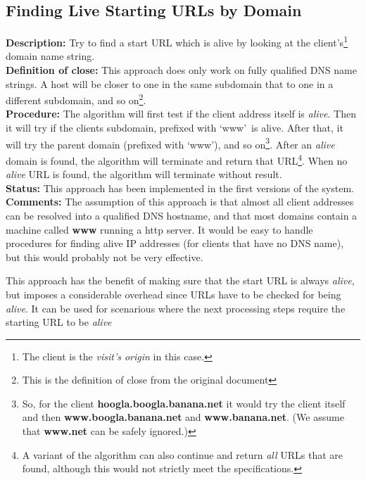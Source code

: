 \documentclass[a4paper]{danarticle}
\begin{document}
      \subsection*{Finding Live Starting URLs by Domain}
      \textbf{Description:} Try to find a start URL which is
      alive by looking at the client's\footnote{The client is the
      \textit{visit's origin} in this case.} domain name string.
      \\
      \textbf{Definition of close:} This approach does only work on
      fully qualified DNS name strings. A host will be closer to
      one in the same subdomain that to one in a different subdomain,
      and so on\footnote{This is the definition of close from the
      original document}.
      \\
      \textbf{Procedure:} The algorithm will first test if the client
      address itself is \textit{alive}. Then it will try if the
      clients subdomain, prefixed with \lq www\rq\ is alive. After
      that, it will try the parent domain (prefixed with \lq www\rq ), and
      so on\footnote{So, for the client \textbf{hoogla.boogla.banana.net}
      it would try the client itself and then \textbf{www.boogla.banana.net}
      and \textbf{www.banana.net}. (We assume that \textbf{www.net} can be
      safely ignored.)}. After an \textit{alive} domain is found, the
      algorithm will terminate and return that URL\footnote{A variant
      of the algorithm can also continue and return \textit{all} URLs that
      are found, although this would not strictly meet the specifications.}.
      When no \textit{alive} URL is found, the algorithm will terminate
      without result.
      \\
      \textbf{Status:} This approach has been implemented in the first
      versions of the system. 
      \\
      \textbf{Comments:} The assumption of this approach is that almost
      all client addresses can be resolved into a qualified DNS hostname, 
      and that most domains contain a machine called \textbf{www} running
      a http server. It would be easy to handle procedures for finding alive
      IP addresses (for clients that have no DNS name), but this would 
      probably not be very effective.
      
      This approach has the benefit of making sure that the start URL is 
      always \textit{alive}, but imposes a considerable overhead since
      URLs have to be checked for being \textit{alive}. It can be used for
      scenarious where the next processing steps require the starting URL
      to be \textit{alive}
\end{document}
